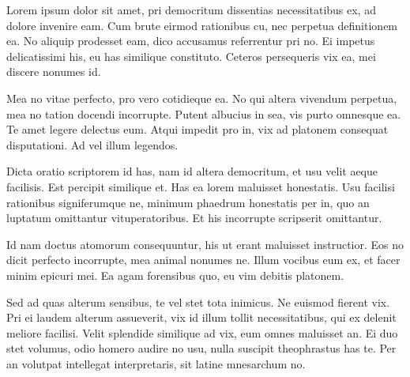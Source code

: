 \documentclass[
	12pt,				%
	openright,			%
	oneside,			%
	a4paper,			%
	english,			%
	french,				%
	spanish,			%
	brazil,				%
	]{abntex2}
\begin{document}
\begin{agradecimentos}

Lorem ipsum dolor sit amet, pri democritum dissentias necessitatibus ex, ad dolore invenire eam. Cum brute eirmod rationibus cu, nec perpetua definitionem ea. No aliquip prodesset eam, dico accusamus referrentur pri no. Ei impetus delicatissimi his, eu has similique constituto. Ceteros persequeris vix ea, mei discere nonumes id.

Mea no vitae perfecto, pro vero cotidieque ea. No qui altera vivendum perpetua, mea no tation docendi incorrupte. Putent albucius in sea, vis purto omnesque ea. Te amet legere delectus eum. Atqui impedit pro in, vix ad platonem consequat disputationi. Ad vel illum legendos.

Dicta oratio scriptorem id has, nam id altera democritum, et usu velit aeque facilisis. Est percipit similique et. Has ea lorem maluisset honestatis. Usu facilisi rationibus signiferumque ne, minimum phaedrum honestatis per in, quo an luptatum omittantur vituperatoribus. Et his incorrupte scripserit omittantur.

Id nam doctus atomorum consequuntur, his ut erant maluisset instructior. Eos no dicit perfecto incorrupte, mea animal nonumes ne. Illum vocibus eum ex, et facer minim epicuri mei. Ea agam forensibus quo, eu vim debitis platonem.

Sed ad quas alterum sensibus, te vel stet tota inimicus. Ne euismod fierent vix. Pri ei laudem alterum assueverit, vix id illum tollit necessitatibus, qui ex delenit meliore facilisi. Velit splendide similique ad vix, eum omnes maluisset an. Ei duo stet volumus, odio homero audire no usu, nulla suscipit theophrastus has te. Per an volutpat intellegat interpretaris, sit latine mnesarchum no.

\end{agradecimentos}


\end{document}
